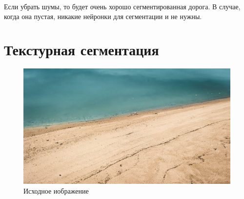 Если убрать шумы, то будет очень хорошо сегментированная дорога. В случае, когда она пустая, никакие нейронки для сегментации и не нужны.

\pagebreak

\section{Текстурная сегментация}

\begin{figure}[ht]
    \includegraphics[width=\textwidth]{../source/sea.png}
    \caption{Исходное иображение}
    \label{fig:р}
\end{figure}

\pagebreak

